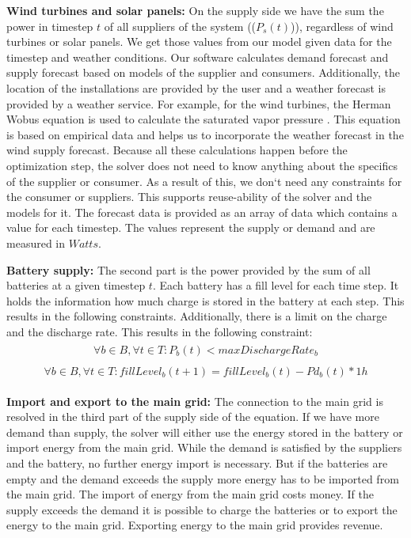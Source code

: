 \textbf{Wind turbines and solar panels:} On the supply side we have the sum the power in timestep $t$ of all suppliers of the system (($P_{s}(t)$)), regardless of wind turbines or solar panels.
We get those values from our model given data for the timestep and weather conditions. 
Our software calculates demand forecast and supply forecast based on models of the supplier and consumers. 
Additionally, the location of the installations are provided by the user and a weather forecast is provided by a weather service. 
For example, for the wind turbines, the Herman Wobus equation is used to calculate the saturated vapor pressure \cite{NOAA}. 
This equation is based on empirical data and helps us to incorporate the weather forecast in the wind supply forecast. 
Because all these calculations happen before the optimization step, the solver does not need to know anything about the specifics of the supplier or consumer. As a result of this, we don`t need any constraints for the consumer or suppliers. 
This supports reuse-ability of the solver and the models for it. 
The forecast data is provided as an array of data which contains a value for each timestep. 
The values represent the supply or demand and are measured in $Watts$.  %

\textbf{Battery supply:} The second part is the power provided by the sum of all batteries at a given timestep $t$.  Each battery has a fill level for each time step. It holds the information how much charge is stored in the battery at each step. This results in the following constraints. Additionally, there is a limit on the charge and the discharge rate. This results in the following constraint:
\begin{align} \label{eq:limitDischarge}
\begin{split}
\forall b \in B, \forall t \in T: P_{b}(t) < maxDischargeRate_{b}
\end{split}
\end{align}
\begin{align} \label{eq:discharge100}
\begin{split}
\forall b \in B, \forall t \in T: fillLevel_{b}(t+1) = fillLevel_{b}(t) - Pd_{b}(t) * 1h
\end{split}
\end{align}

\textbf{Import and export to the main grid:} The connection to the main grid is resolved in the third part of the supply side of the equation.
If we have more demand than supply, the solver will either use the energy stored in the battery or import energy from the main grid. While the demand is satisfied by the suppliers and the battery, no further energy import is necessary. But if the batteries are empty and the demand exceeds the supply more energy has to be imported from the main grid. The import of energy from the main grid costs money. If the supply exceeds the demand it is possible to charge the batteries or to export the energy to the main grid. Exporting energy to the main grid provides revenue.

